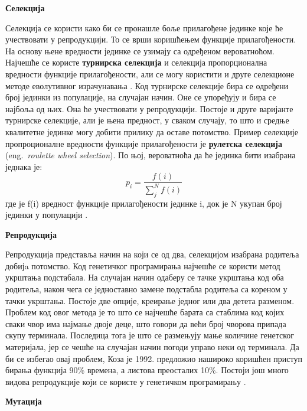 \documentclass[a4paper]{article}
\begin{document}
\medskip
\noindent
\textbf{\large Селекција}\newline

Селекција се користи како би се пронашле боље прилагођене јединке које ће учествовати у репродукцији. То се врши коришћењем функције прилагођености. На основу њене вредности јединке се узимају са одређеном вероватноћом. Најчешће се користе \textbf{турнирска селекција} и селекција пропорционална вредности функције прилагођености, али се могу користити и друге селекционе методе еволутивног израчунавања \cite{compIntelligence}. Код турнирске селекције бира се одређени број јединки из популације, на случајан начин. Оне се упоређују и бира се најбоља од њих. Она ће учествовати у репродукцији. Постоје и друге варијанте турнирске селекције, али је њена предност, у сваком случају, то што и средње квалитетне јединке могу добити прилику да оставе потомство. Пример селекције пропроционалне вредности функције прилагођености је \textbf{рулетска селекција} (eng.~{\em roulette wheel selection}). По њој, вероватноћа да ће јединка бити изабрана једнака је: 
\begin{equation} 
    p_i = \frac{f(i)}{\sum_{j}^{N} f(i)}
\end{equation}
где је f(i) вредност функције прилагођености јединке i, док је N укупан број јединки у популацији \cite{vi}.\newline


\medskip
\noindent
\textbf{\large Репродукција}\newline

Репродукција представља начин на који се од два, селекцијом изабрана родитеља добијa потомство. Код генетичког програмирања најчешће се користи метод укрштања подстабала. На случајан начин одаберу се тачке укрштања код оба родитеља, након чега се једноставно замене подстабла родитеља са кореном у тачки укрштања. Постоје две опције, креирање једног или два детета разменом. Проблем код овог метода је то што се најчешће барата са стаблима код којих сваки чвор има најмање двоје деце, што говори да већи број чворова припада скупу терминала. Последица тога је што се размењују мање количине генетског материјала, јер се чешће на случајан начин погоди управо неки од терминала. Да би се избегао овај проблем, Коза је 1992. предложио нашироко коришћен приступ бирања функција 90\% времена, а листова преосталих 10\%. Постоји још много видова репродукције који се користе у генетичком програмирању \cite{fieldGuidetoGP}.\newline

\medskip
\noindent
\textbf{\large Мутација}\newline
\end{document}
